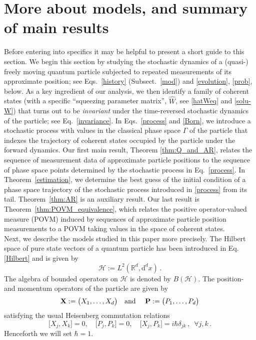 \documentclass[11pt]{article}
\renewcommand{\d}{{\mathrm d}}
\begin{document}
\section{More about models, and summary of main results}\label{models}
Before entering into specifics it may be helpful to present a short guide to this section.
We begin this section by studying the stochastic dynamics of a (quasi-) freely 
moving quantum particle subjected to repeated measurements of its approximate position; see Eqs.~\eqref{history} 
(Subsect.~\ref{mod}) and \eqref{evolution}, \eqref{prob}, below. As a key ingredient of our analysis, we then
identify a family of coherent states (with a specific ``squeezing parameter matrix'', $\widehat{W}$, see \eqref{hatWeq} 
and \eqref{solu-W}) 
that turns out to be \textit{invariant} under the time-reversed stochastic dynamics of the particle; see Eq.~\eqref{invariance}. In 
Eqs.~\eqref{process} and \eqref{Born}, we introduce a stochastic process with values in the classical phase 
space $\Gamma$ of the particle that indexes the trajectory of coherent states occupied by the particle under the 
forward dynamics. Our first main result, Theorem \ref{thm:Q_and_AR}, 
relates the sequence of measurement data of approximate particle positions to the sequence of 
phase space points determined by the 
stochastic process in Eq.~\eqref{process}. In Theorem~\ref{estimation}, we determine the best guess of the initial 
condition of a phase space trajectory of the stochastic process introduced in \eqref{process} from its tail. 
Theorem~\ref{thm:AR} is an auxiliary result. Our last result is Theorem~\ref{thm:POVM_equivalence}, which 
relates the  positive operator-valued measure (POVM) induced by sequences of approximate particle position 
measurements to a POVM taking values in the 
space of coherent states. \\

Next, we describe the models studied in this paper more precisely.
The Hilbert space of pure state vectors of a quantum particle 
has been introduced in Eq. \eqref{Hilbert} and is given by
\begin{equation}\label{space}
\mathcal{H}:= L^{2}(\mathbb{R}^{d}, \d^{d}x)\,.
\end{equation}
The algebra of bounded operators on $\mathcal{H}$ is denoted by $B(\mathcal{H})$. The position- and momentum 
operators of the particle  are given by 
\begin{equation}\label{X-P}
{\bf{X}}:= \big(X_1, \dots, X_{d} \big) \quad \text{and } \quad {\bf{P}}:= \big( P_1,\dots, P_{d} \big)
\end{equation}
satisfying the usual Heisenberg commutation relations
\begin{equation}\label{CR}
\big[X_j, X_k \big]=0, \quad \big[P_j, P_k \big]=0, \quad  \big[X_j, P_k \big] = i \hbar \delta_{jk}\,,\,\,\,\forall j, k\,.
\end{equation}
Henceforth we will set $\hbar=1$. 
\end{document}
